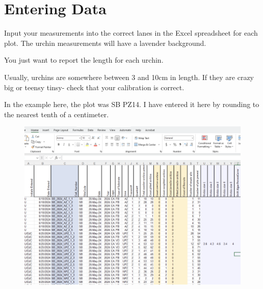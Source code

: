 \documentclass[12pt,letterpaper]{article}
\begin{document}
\section{Entering Data}

Input your measurements into the correct lanes in the Excel spreadsheet for each plot. The urchin measurements will have a lavender background.  

You just want to report the length for each urchin.  

Usually, urchins are somewhere between 3 and 10cm in length. If they are crazy big or teensy tinsy- check that your calibration is correct.  

In the example here, the plot was SB PZ14. I have entered it here by rounding to the nearest tenth of a centimeter.  

\begin{figure}[H]
	\centering
	\includegraphics[width=1\linewidth]{figs/IntoExcel.png}
	\caption{}
	\label{fig:logo}
\end{figure}
\end{document}
